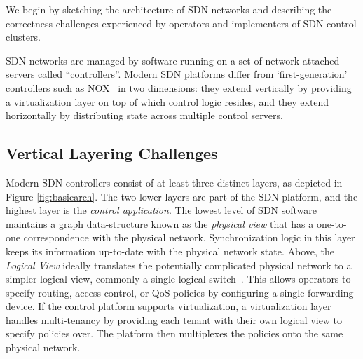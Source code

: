 We begin by sketching the architecture of SDN networks and
describing the correctness challenges experienced by operators and
implementers of SDN control clusters.

SDN networks are managed by software running on a set of network-attached
servers called ``controllers''. Modern SDN platforms differ from
`first-generation' controllers such as NOX~\cite{nox} in two dimensions: they
extend vertically by providing a virtualization layer on top of which control
logic resides, and they extend horizontally by distributing state across
multiple control servers.


\subsection{Vertical Layering Challenges}

Modern SDN controllers consist of at least three distinct layers, as depicted in
Figure \ref{fig:basicarch}. The two lower layers are part of the SDN platform,
and the highest layer is the \emph{control application}. The lowest level of SDN
software maintains a graph data-structure known as the \emph{physical view}
that has a one-to-one correspondence with the physical network.
Synchronization logic in this layer keeps its information up-to-date with the
physical network state. Above, the \emph{Logical View} ideally translates the
potentially complicated physical network to a simpler logical view, commonly a single
logical switch~\cite{Casado:2010:VNF:1921151.1921162}. This allows operators to
specify routing, access control, or QoS policies by configuring a single
forwarding device. If the control platform supports virtualization, a
virtualization layer handles multi-tenancy by providing each tenant with their
own logical view to specify policies over. The platform then multiplexes the
policies onto the same physical network.

